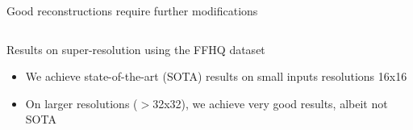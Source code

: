 \begin{frame}{Good reconstructions require further modifications}
\begin{columns}
\begin{column}{\textwidth}
\begin{overprint}
 \begin{center}\end{center}
 \begin{center}\end{center}
 \begin{center}\end{center}
 \begin{center}\end{center}
 \begin{center}\end{center}
 \begin{center}\end{center}
% 
% 

\end{overprint}


 \end{column}

\end{columns}

 
\end{frame}



\begin{frame}{Results on super-resolution using the FFHQ dataset}

\begin{itemize}
 \item We achieve state-of-the-art (SOTA) results on small inputs resolutions 16x16
 \item On larger resolutions ($>$32x32), we achieve very good results, albeit not SOTA
\end{itemize}

\begin{center}
\vt
{}
\end{center}
 
\end{frame}


